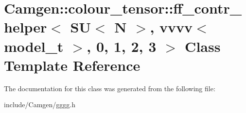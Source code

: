 \hypertarget{a00229}{}\section{Camgen\+:\+:colour\+\_\+tensor\+:\+:ff\+\_\+contr\+\_\+helper$<$ S\+U$<$ N $>$, vvvv$<$ model\+\_\+t $>$, 0, 1, 2, 3 $>$ Class Template Reference}
\label{a00229}


The documentation for this class was generated from the following file\+:\begin{DoxyCompactItemize}
\item 
include/\+Camgen/gggg.\+h\end{DoxyCompactItemize}
